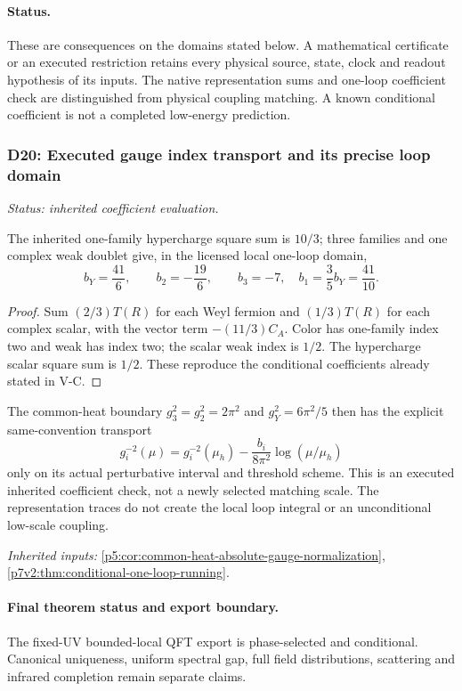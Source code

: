 \documentclass[12pt,a4paper]{article}
\begin{document}
\paragraph{Status.}
These are consequences on the domains stated below.
A mathematical certificate or an executed restriction retains every
physical source, state, clock and readout hypothesis of its inputs.
The native representation sums and one-loop coefficient check
are distinguished from physical coupling matching. A known conditional
coefficient is not a completed low-energy prediction.


\subsubsection{D20: Executed gauge index transport and its precise loop domain}
\label{p12:sec:v2201-derived-d20}
\noindent\textit{Status: inherited coefficient evaluation.}

The inherited one-family hypercharge square sum is $10/3$; three families
and one complex weak doublet give, in the licensed local one-loop domain,
\[
 b_Y=\frac{41}6,\qquad b_2=-\frac{19}6,\qquad b_3=-7,
 \quad b_1=\frac35b_Y=\frac{41}{10}.
\]
\begin{proof}
Sum $(2/3)T(R)$ for each Weyl fermion and $(1/3)T(R)$ for
each complex scalar, with the vector term $-(11/3)C_A$. Color has
one-family index two and weak has index two; the scalar weak index is
$1/2$. The hypercharge scalar square sum is $1/2$. These reproduce the
conditional coefficients already stated in V-C.
\end{proof}
The common-heat boundary $g_3^2=g_2^2=2\pi^2$ and
$g_Y^2=6\pi^2/5$ then has the explicit same-convention transport
\[
 g_i^{-2}(\mu)=g_i^{-2}(\mu_h)
 -\frac{b_i}{8\pi^2}\log(\mu/\mu_h)
\]
only on its actual perturbative interval and threshold scheme. This is an
executed inherited coefficient check, not a newly selected matching scale.
The representation traces do not create the local loop integral or an
unconditional low-scale coupling.
\par\noindent\textit{Inherited inputs:} \ref{p5:cor:common-heat-absolute-gauge-normalization}, \ref{p7v2:thm:conditional-one-loop-running}.



\paragraph{Final theorem status and export boundary.}
The fixed-UV bounded-local QFT export is phase-selected and conditional. Canonical uniqueness, uniform spectral gap, full field distributions, scattering and infrared completion remain separate claims.
\end{document}
